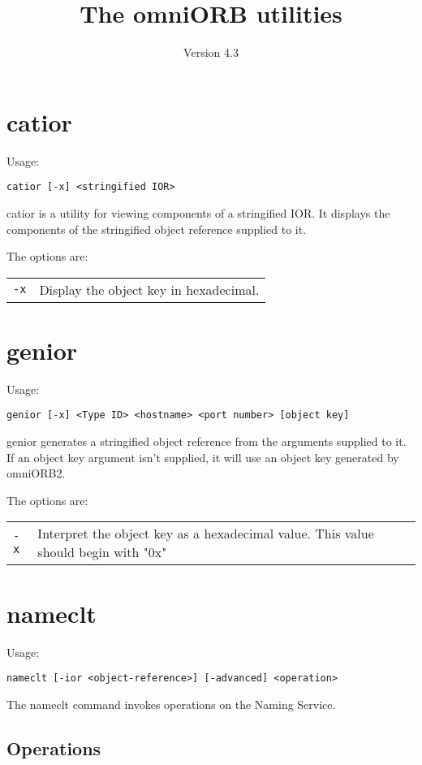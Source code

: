 \documentclass[11pt,oneside,a4paper]{article}
\title{The omniORB utilities}
\date{Version 4.3}
\begin{document}
\maketitle

\section{catior}
Usage:
\begin{verbatim}
catior [-x] <stringified IOR>
\end{verbatim}

\noindent catior is a utility for viewing components of a stringified
IOR.  It displays the components of the stringified object reference
supplied to it.

The options are:


\begin{tabular}{ll}
\verb.-x.
  & Display the object key in hexadecimal.
\end{tabular}


\section{genior}
Usage: 
\begin{verbatim}
genior [-x] <Type ID> <hostname> <port number> [object key]
\end{verbatim}

\noindent genior generates a stringified object reference from the
arguments supplied to it.  If an object key argument isn't supplied,
it will use an object key generated by omniORB2.

The options are:


\begin{tabular}{lp{}}
\verb.-x.
 & Interpret the object key as a hexadecimal value. This 
value should begin with "0x"
\end{tabular}


\section{nameclt}
Usage: 
\begin{verbatim}
nameclt [-ior <object-reference>] [-advanced] <operation> 
\end{verbatim}

\noindent The nameclt command invokes operations on the Naming
Service.

\subsection{Operations}
\end{document}
